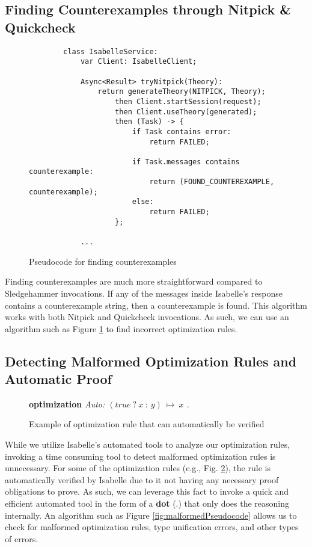 \subsection{Finding Counterexamples through Nitpick \& Quickcheck}

\begin{figure}[!htb]
    \begin{lstlisting}
        class IsabelleService:
            var Client: IsabelleClient;
            
            Async<Result> tryNitpick(Theory):
                return generateTheory(NITPICK, Theory);
                    then Client.startSession(request);
                    then Client.useTheory(generated);
                    then (Task) -> {
                        if Task contains error:
                            return FAILED;

                        if Task.messages contains counterexample:
                            return (FOUND_COUNTEREXAMPLE, counterexample);
                        else:
                            return FAILED;
                    };
            
            ...
    \end{lstlisting}

    \caption{Pseudocode for finding counterexamples}
    \label{fig:counterexamplePseudocode}
\end{figure}

Finding counterexamples are much more straightforward compared to Sledgehammer invocations. If any of the messages inside Isabelle's response 
contains a counterexample string, then a counterexample is found. This algorithm works with both Nitpick and Quickcheck invocations. As such, 
we can use an algorithm such as Figure \ref{fig:counterexamplePseudocode} to find incorrect optimization rules.

\subsection{Detecting Malformed Optimization Rules and Automatic Proof}

\begin{figure}[!htb]
    \centering
    \textbf{optimization} \emph{Auto: \((true~?~x~:~y)\ \longmapsto\ x\) .}

    \caption{Example of optimization rule that can automatically be verified}
    \label{fig:AutoExample}
\end{figure}

While we utilize Isabelle's automated tools to analyze our optimization rules, invoking a time consuming tool to detect malformed optimization rules 
is unnecessary. For some of the optimization rules (e.g., Fig. \ref{fig:AutoExample}), the rule is automatically verified by Isabelle due to it not 
having any necessary proof obligations to prove. As such, we can leverage this fact to invoke a quick and efficient automated tool in the form of a 
\textbf{dot} (.) that only does the reasoning internally. An algorithm such as Figure \ref{fig:malformedPseudocode} allows us to check for malformed 
optimization rules, type unification errors, and other types of errors.

